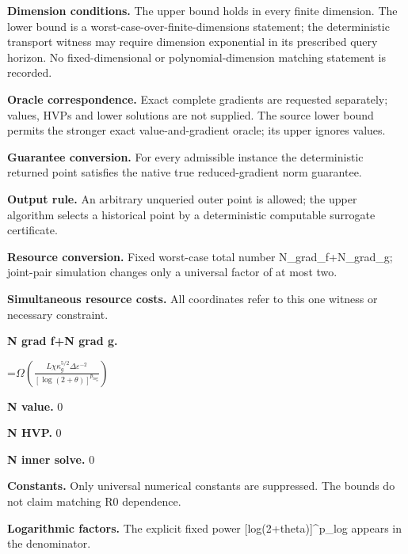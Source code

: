 \documentclass[10pt,a4paper]{article}
\newcommand{\AtlasMath}[1]{\par\begingroup\centering\setbox0=\hbox{$\displaystyle #1$}\ifdim\wd0>1.4\linewidth\typeout{ATLAS WIDE FORMULA: \the\wd0}\fi\ifdim\wd0>\linewidth\resizebox{\linewidth}{!}{\box0}\else\box0\fi\par\endgroup}
\begin{document}
\textbf{Dimension conditions.} The upper bound holds in every finite dimension. The lower bound is a worst-case-over-finite-dimensions statement; the deterministic transport witness may require dimension exponential in its prescribed query horizon. No fixed-dimensional or polynomial-dimension matching statement is recorded.



\textbf{Oracle correspondence.} Exact complete gradients are requested separately; values, HVPs and lower solutions are not supplied. The source lower bound permits the stronger exact value-and-gradient oracle; its upper ignores values.



\textbf{Guarantee conversion.} For every admissible instance the deterministic returned point satisfies the native true reduced-gradient norm guarantee.



\textbf{Output rule.} An arbitrary unqueried outer point is allowed; the upper algorithm selects a historical point by a deterministic computable surrogate certificate.



\textbf{Resource conversion.} Fixed worst-case total number N\_grad\_f+N\_grad\_g; joint-pair simulation changes only a universal factor of at most two.



\textbf{Simultaneous resource costs.} All coordinates refer to this one witness or necessary constraint.



\textbf{N grad f+N grad g.}



\AtlasMath{\Omega\!\left(\frac{L\chi\kappa_g^{5/2}\Delta\varepsilon^{-2}}{[\log(2+\theta)]^{p_{\log}}}\right)}


\textbf{N value.} 0



\textbf{N HVP.} 0



\textbf{N inner solve.} 0



\textbf{Constants.} Only universal numerical constants are suppressed. The bounds do not claim matching R0 dependence.



\textbf{Logarithmic factors.} The explicit fixed power [log(2+theta)]\textasciicircum{}p\_log appears in the denominator.
\end{document}
